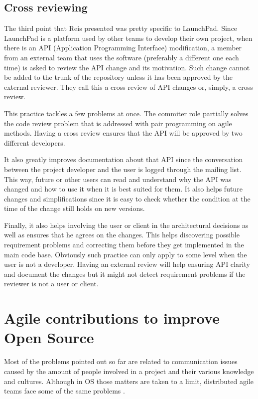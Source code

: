 \subsection{Cross reviewing}
\label{subsec:crossrev}

The third point that Reis presented was pretty specific to
LaunchPad. Since LaunchPad is a platform used by other teams to
develop their own project, when there is an API (Application
Programming Interface) modification, a member from an external team
that uses the software (preferably a different one each time) is asked
to review the API change and its motivation. Such change cannot be
added to the trunk of the repository unless it has been approved by
the external reviewer. They call this a cross review of API changes
or, simply, a cross review.

This practice tackles a few problems at once. The commiter role
partially solves the code review problem that is addressed with pair
programming on agile methods. Having a cross review ensures that the
API will be approved by two different developers.

It also greatly improves documentation about that API since the
conversation between the project developer and the user is logged
through the mailing list. This way, future or other users can read and
understand why the API was changed and how to use it when it is best
suited for them. It also helps future changes and simplifications
since it is easy to check whether the condition at the time of the
change still holds on new versions.

Finally, it also helps involving the user or client in the
architectural decisions as well as ensures that he agrees on the
changes. This helps discovering possible requirement problems and
correcting them before they get implemented in the main code
base. Obviously such practice can only apply to some level when the
user is not a developer. Having an external review will help ensuring
API clarity and document the changes but it might not detect
requirement problems if the reviewer is not a user or client.

\section{Agile contributions to improve Open Source}
\label{sec:agile-improve-os}

Most of the problems pointed out so far are related to communication
issues caused by the amount of people involved in a project and their
various knowledge and cultures. Although in OS those matters are taken
to a limit, distributed agile teams face some of the same problems
\cite{Sutherland2007,Maurer2002}.

